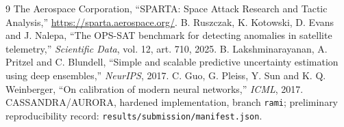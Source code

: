 \documentclass[10pt,a4paper,twocolumn]{article}
\begin{document}
\begin{thebibliography}{9}
 The Aerospace Corporation, ``SPARTA: Space Attack Research and Tactic Analysis,'' \url{https://sparta.aerospace.org/}.
 B. Ruszczak, K. Kotowski, D. Evans and J. Nalepa, ``The OPS-SAT benchmark for detecting anomalies in satellite telemetry,'' \emph{Scientific Data}, vol. 12, art. 710, 2025.
 B. Lakshminarayanan, A. Pritzel and C. Blundell, ``Simple and scalable predictive uncertainty estimation using deep ensembles,'' \emph{NeurIPS}, 2017.
 C. Guo, G. Pleiss, Y. Sun and K. Q. Weinberger, ``On calibration of modern neural networks,'' \emph{ICML}, 2017.
 CASSANDRA/AURORA, hardened implementation, branch \texttt{rami}; preliminary reproducibility record: \texttt{results/submission/manifest.json}.
\end{thebibliography}
\end{document}
